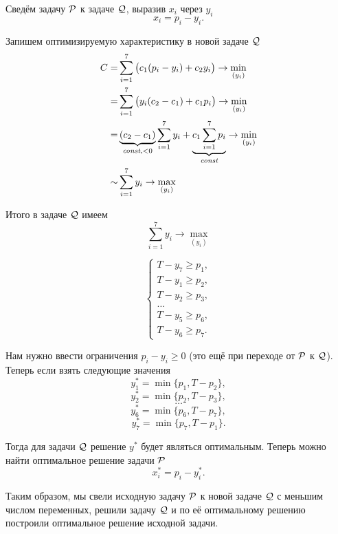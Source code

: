 Сведём задачу $\P$ к задаче $\Q$, выразив $x_i$ через $y_i$
\[
	x_i = p_i - y_i.
\]

Запишем оптимизируемую характеристику в новой задаче $\Q$
\begin{align*}
	C =& \sum_{i=1}^7 \big(c_1 (p_i - y_i) + c_2 y_i\big) \to \min_{(y_i)} \\
	=&  \sum_{i=1}^7 \big(y_i (c_2 - c_1) + c_1 p_i\big) \to \min_{(y_i)} \\
	=& \underbrace{(c_2 - c_1)}_{\const, <0} \sum_{i=1}^7 y_i + \underbrace{c_1 \sum_{i=1}^{7} p_i}_{\const} \to \min_{(y_i)} \\
	\sim& \sum_{i=1}^7 y_i \to \max_{(y_i)}
\end{align*}

Итого в задаче $\Q$ имеем
\[
	\sum_{i=1}^7 y_i \to \max_{(y_i)}
\]

\[
	\begin{cases}
		T - y_7 \ge p_1, \\
		T - y_1 \ge p_2, \\
		T - y_2 \ge p_3, \\
		\dots \\
		T - y_5 \ge p_6, \\
		T - y_6 \ge p_7.
	\end{cases}
\]

Нам нужно ввести ограничения $p_i - y_i \ge 0$ (это ещё при переходе от $\P$ к $\Q$). Теперь если взять следующие значения
\[
	y_1^* = \min\{p_1, T - p_2\},
\]
\[
	y_2^* = \min\{p_2, T - p_3\},
\]
\[
	\dots
\]
\[
	y_6^* = \min\{p_6, T - p_7\},
\]
\[
	y_7^* = \min\{p_7, T - p_1\}.
\]

Тогда для задачи $\Q$ решение $y^*$ будет являться оптимальным. Теперь можно найти оптимальное решение задачи $\P$
\[
	x_i^* = p_i - y_i^*.
\]

Таким образом, мы свели исходную задачу $\P$ к новой задаче $\Q$ с меньшим числом переменных, решили задачу $\Q$ и по её оптимальному решению построили оптимальное решение исходной задачи.
